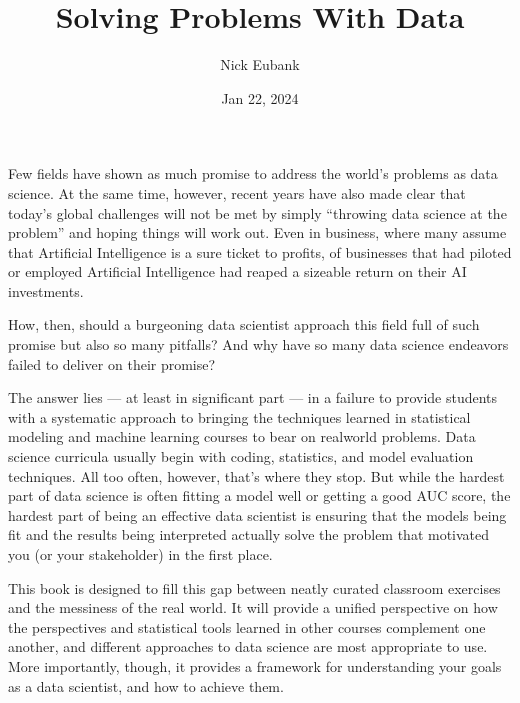 \documentclass[letterpaper,10pt,english]{jupyterBook}
\title{Solving Problems With Data}
\date{Jan 22, 2024}
\author{Nick Eubank}
\begin{document}
\pagestyle{empty}
\sphinxmaketitle
\pagestyle{plain}
\sphinxtableofcontents
\pagestyle{normal}
\label{\detokenize{landing_page::doc}}


\sphinxAtStartPar
{}

\sphinxAtStartPar
Few fields have shown as much promise to address the world’s problems as data science. At the same time, however, recent years have also made clear that today’s global challenges will not be met by simply “throwing data science at the problem” and hoping things will work out. Even in business, where many assume that Artificial Intelligence is a sure ticket to profits,  of businesses that had piloted or employed Artificial Intelligence had reaped a sizeable return on their AI investments.

\sphinxAtStartPar
How, then, should a burgeoning data scientist approach this field full of such promise but also so many pitfalls? And why have so many data science endeavors failed to deliver on their promise?

\sphinxAtStartPar
The answer lies — at least in significant part — in a failure to provide students with a systematic approach to bringing the techniques learned in statistical modeling and machine learning courses to bear on real\sphinxhyphen{}world problems. Data science curricula usually begin with coding, statistics, and model evaluation techniques. All too often, however, that’s where they stop. But while the hardest part of data science  is often fitting a model well or getting a good AUC score, the hardest part of being an effective  data scientist is ensuring that the models being fit and the results being interpreted actually solve the problem that motivated you (or your stakeholder) in the first place.

\sphinxAtStartPar
This book is designed to fill this gap between neatly curated classroom exercises and the messiness of the real world.  It will provide a unified perspective on how the perspectives and statistical tools learned in other courses complement one another, and  different approaches to data science are most appropriate to use. More importantly, though, it provides a framework for understanding your goals as a data scientist, and how to achieve them.
\end{document}
